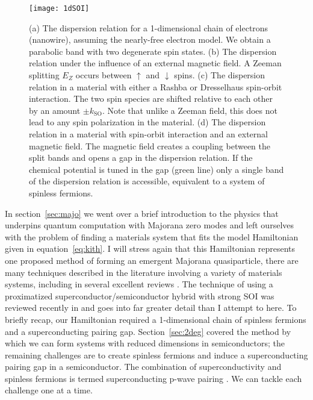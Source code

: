 \begin{figure}
  \texttt{[image: 1dSOI]}
  \caption[Spin-orbit interaction in a nanowire with a magnetic field]
  {\label{fig:1dsoi}(a) The dispersion relation for a 1-dimensional chain of electrons (nanowire), assuming the nearly-free electron model. We obtain a parabolic band with two degenerate spin states. (b) The dispersion relation under the influence of an external magnetic field. A Zeeman splitting $E_Z$ occurs between $\uparrow$ and $\downarrow$ spins. (c) The dispersion relation in a material with either a Rashba or Dresselhaus spin-orbit interaction. The two spin species are shifted relative to each other by an amount $\pm k_\textrm{SO}$. Note that unlike a Zeeman field, this does not lead to any spin polarization in the material. (d) The dispersion relation in a material with spin-orbit interaction and an external magnetic field. The magnetic field creates a coupling between the split bands and opens a gap in the dispersion relation. If the chemical potential is tuned in the gap (green line) only a single band of the dispersion relation is accessible, equivalent to a system of spinless fermions.}
\end{figure}

In section~\ref{sec:majo} we went over a brief introduction to the physics that underpins quantum computation with Majorana zero modes
and left ourselves with the problem of finding a materials system that fits the model Hamiltonian given in equation~\ref{eq:kith}. I will stress
again that this Hamiltonian represents one proposed method of forming an emergent Majorana quasiparticle, there are many techniques described
in the literature involving a variety of materials systems, including in several excellent reviews \cite{RevModPhys.83.1057,doi:10.1146/030212-184337,Leijnse_2012,
RevModPhys.87.137,npjqi.2015.1,Aguado:2017ofc}. The technique of using a proximatized superconductor/semiconductor hybrid with strong SOI was reviewed
recently in \cite{s41578-018-0003-1} and goes into far greater detail than I attempt to here. To briefly recap, our Hamiltonian required a 1-dimensional
chain of spinless fermions and a superconducting pairing gap. Section~\ref{sec:2deg} covered the method by which we
can form systems with reduced dimensions in semiconductors; the remaining challenges are to create spinless fermions and induce a superconducting pairing gap
in a semiconductor. The combination of superconductivity and spinless fermions is termed superconducting p-wave pairing \cite{Kitaev_2001}. We can tackle
each challenge one at a time.

